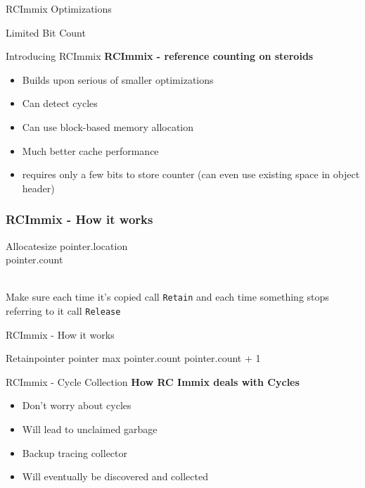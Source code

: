 \documentclass{beamer}
\begin{document}
\begin{frame}{RCImmix Optimizations}
	\item Limited Bit Count
\end{frame}


\begin{frame}{Introducing RCImmix}
	\textbf{RCImmix - reference counting on steroids}
	\begin{itemize}
		\item Builds upon serious of smaller optimizations
		\item Can detect cycles
		\item Can use block-based memory allocation
		\item Much better cache performance
		\item requires only a few bits to store counter (can even use existing space in object header)
	\end{itemize}
\end{frame}

\addtocounter{section}{1}

\begin{frame}[fragile]
\frametitle{RCImmix - How it works}
	\begin{pseudocode}{Allocate}{size}
	pointer.location \GETS {}\\
	pointer.count \\
	\end{pseudocode}\\
	Make sure each time it's copied call \texttt{Retain} and each time something stops referring to it call \texttt{Release}
\end{frame}

\begin{frame}{RCImmix - How it works}
	\begin{pseudocode}{Retain}{pointer}
	\IF pointer \NOT max
		\THEN pointer.count \GETS pointer.count + 1
	\end{pseudocode}
		
\end{frame}

\begin{frame}{RCImmix - Cycle Collection}
	\textbf{How RC Immix deals with Cycles}
	\begin{itemize}
		\item Don't worry about cycles
		\item Will lead to unclaimed garbage
		\pause
		\item Backup tracing collector
		\item Will eventually be discovered and collected
	\end{itemize}
\end{frame}
\end{document}
